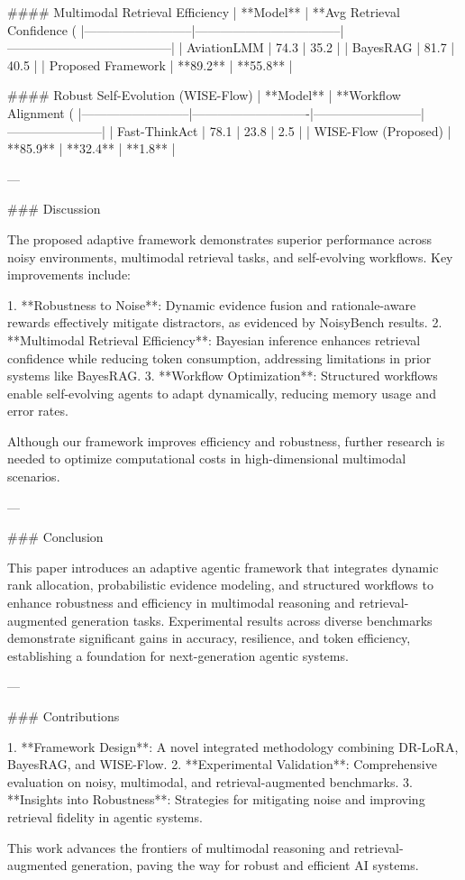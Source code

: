 #### Multimodal Retrieval Efficiency
| **Model**               | **Avg Retrieval Confidence (%
|--------------------------|-----------------------------------|---------------------------------------|
| AviationLMM             | 74.3                             | 35.2                                  |
| BayesRAG                | 81.7                             | 40.5                                  |
| Proposed Framework      | **89.2**                         | **55.8**                              |

#### Robust Self-Evolution (WISE-Flow)
| **Model**               | **Workflow Alignment (%
|--------------------------|----------------------------|--------------------------|-----------------------|
| Fast-ThinkAct           | 78.1                      | 23.8                     | 2.5                   |
| WISE-Flow (Proposed)    | **85.9**                  | **32.4**                 | **1.8**               |

---

### Discussion

The proposed adaptive framework demonstrates superior performance across noisy environments, multimodal retrieval tasks, and self-evolving workflows. Key improvements include:

1. **Robustness to Noise**: Dynamic evidence fusion and rationale-aware rewards effectively mitigate distractors, as evidenced by NoisyBench results.
2. **Multimodal Retrieval Efficiency**: Bayesian inference enhances retrieval confidence while reducing token consumption, addressing limitations in prior systems like BayesRAG.
3. **Workflow Optimization**: Structured workflows enable self-evolving agents to adapt dynamically, reducing memory usage and error rates.

Although our framework improves efficiency and robustness, further research is needed to optimize computational costs in high-dimensional multimodal scenarios.

---

### Conclusion

This paper introduces an adaptive agentic framework that integrates dynamic rank allocation, probabilistic evidence modeling, and structured workflows to enhance robustness and efficiency in multimodal reasoning and retrieval-augmented generation tasks. Experimental results across diverse benchmarks demonstrate significant gains in accuracy, resilience, and token efficiency, establishing a foundation for next-generation agentic systems.

---

### Contributions

1. **Framework Design**: A novel integrated methodology combining DR-LoRA, BayesRAG, and WISE-Flow.
2. **Experimental Validation**: Comprehensive evaluation on noisy, multimodal, and retrieval-augmented benchmarks.
3. **Insights into Robustness**: Strategies for mitigating noise and improving retrieval fidelity in agentic systems.

This work advances the frontiers of multimodal reasoning and retrieval-augmented generation, paving the way for robust and efficient AI systems.